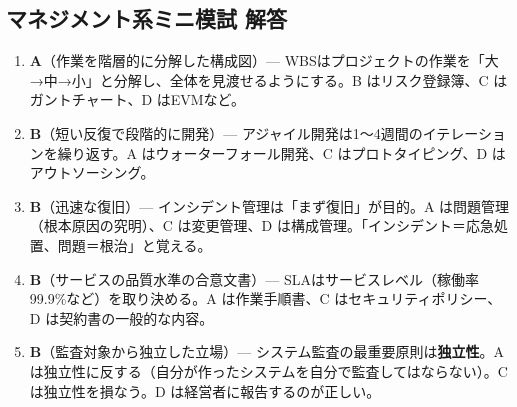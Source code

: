 \kaitoupage
\subsection*{マネジメント系ミニ模試 解答}

\begin{enumerate}
  \item \textbf{A}（作業を階層的に分解した構成図）— WBSはプロジェクトの作業を「大→中→小」と分解し、全体を見渡せるようにする。B はリスク登録簿、C はガントチャート、D はEVMなど。
  \item \textbf{B}（短い反復で段階的に開発）— アジャイル開発は1〜4週間のイテレーションを繰り返す。A はウォーターフォール開発、C はプロトタイピング、D はアウトソーシング。
  \item \textbf{B}（迅速な復旧）— インシデント管理は「まず復旧」が目的。A は問題管理（根本原因の究明）、C は変更管理、D は構成管理。「インシデント＝応急処置、問題＝根治」と覚える。
  \item \textbf{B}（サービスの品質水準の合意文書）— SLAはサービスレベル（稼働率99.9\%など）を取り決める。A は作業手順書、C はセキュリティポリシー、D は契約書の一般的な内容。
  \item \textbf{B}（監査対象から独立した立場）— システム監査の最重要原則は\textbf{独立性}。A は独立性に反する（自分が作ったシステムを自分で監査してはならない）。C は独立性を損なう。D は経営者に報告するのが正しい。
\end{enumerate}


